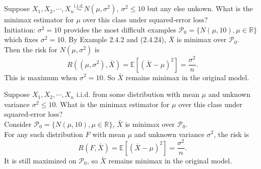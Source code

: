 \documentclass[a4paper]{article}
\begin{document}
\newpage
\begin{eg}
	Suppose $X_1, X_2, \cdots, X_n \stackrel{\text{i.i.d.}}{\sim} N(\mu,\sigma^2), \ \sigma^2 \leq 10$ but any else unkown. What is the minimax estimator for $\mu$ over this class under squared-error loss? \\
	\newline
	Initiation: $\sigma^2 = 10$ provides the most difficult examples $\mathcal{P}_0 = \{N(\mu,10), \mu \in \mathbb{R}\}$ which fixes $\sigma^2 = 10$. By Example 2.4.2 and (2.4.24), $\bar{X}$ is minimax over $\mathcal{P}_0$. \\
	Then the risk for $N(\mu,\sigma^2)$ is
	\begin{equation}
		R((\mu,\sigma^2),\bar{X}) = \mathbb{E}[(\bar{X} - \mu)^2] = \frac{\sigma^2}{n}.
	\end{equation}
	This is maximum when $\sigma^2 = 10$. So $\bar{X}$ remains minimax in the original model.
\end{eg}

\begin{eg}
	Suppose $X_1, X_2, \cdots, X_n$ i.i.d. from some distribution with mean $\mu$ and unknown variance $\sigma^2 \leq 10$. What is the minimax estimator for $\mu$ over this class under squared-error loss? \\
	\newline
	Consider $\mathcal{P}_0 = \{N(\mu,10), \mu \in \mathbb{R}\}$, $\bar{X}$ is minimax over $\mathcal{P}_0$. \\
	For any such distribution $F$ with mean $\mu$ and unknown variance $\sigma^2$, the risk is
	\begin{equation}
		R(F,\bar{X}) = \mathbb{E}[(\bar{X} - \mu)^2] = \frac{\sigma^2}{n}.
	\end{equation}
	It is still maximized on $\mathcal{P}_0$, so $\bar{X}$ remains minimax in the original model.
\end{eg}
\end{document}
